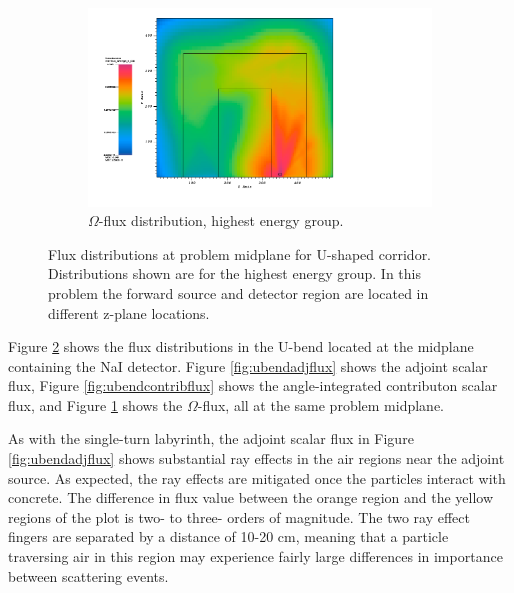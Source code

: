 \begin{figure}[htb!]\ContinuedFloat
  \centering
  \begin{subfigure}[t]{\textwidth}
    \includegraphics[width=0.9\linewidth]{./chapters/characterization_probs/figures/char/prob_2/prob2omegaG00.png}
    \caption{$\Omega$-flux distribution, highest energy group.}
    \label{fig:ubendomegaflux}
  \end{subfigure}
  \caption[Flux distributions at problem midplane for U-shaped corridor.]{Flux
  distributions at problem midplane for U-shaped corridor. Distributions shown
are for the highest energy group. In this problem the forward source and
detector region are located in different z-plane locations.}
  \label{fig:ubendfluxes}
\end{figure}

Figure \ref{fig:ubendfluxes} shows the flux distributions in
the U-bend located at the midplane containing the NaI detector. Figure
\ref{fig:ubendadjflux} shows the adjoint scalar flux, Figure
\ref{fig:ubendcontribflux} shows the angle-integrated contributon scalar flux,
and Figure \ref{fig:ubendomegaflux} shows the $\Omega$-flux, all at the same
problem midplane.

As with the single-turn labyrinth, the adjoint scalar flux
in Figure \ref{fig:ubendadjflux} shows substantial ray effects
in the air regions near the adjoint source. As
expected, the ray effects are mitigated once the particles interact with
concrete. The difference in flux value between the orange region and the yellow
regions of the plot is two- to three- orders of magnitude. The
two ray effect fingers are separated by a distance of 10-20 cm, meaning that a
particle traversing air in this region may experience fairly large differences
in importance between scattering events.

